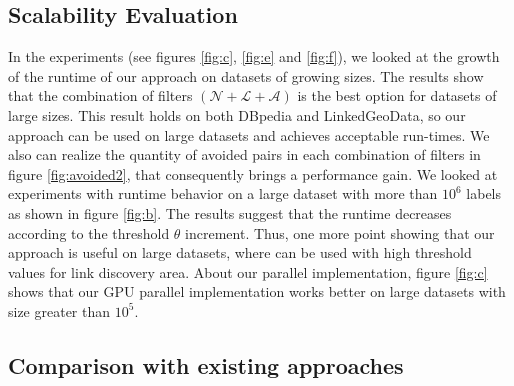 
\subsection{Scalability Evaluation}

In the experiments (see figures \ref{fig:c}, \ref{fig:e} and \ref{fig:f}), we looked at the growth of the runtime of our approach on datasets of growing sizes.
The results show that the combination of filters $(\mathcal{N}+\mathcal{L}+\mathcal{A})$ is the best option for datasets of large sizes.
This result holds on both DBpedia and LinkedGeoData, so our approach can be used on large datasets and achieves acceptable run-times. 
We also can realize the quantity of avoided pairs in each combination of filters in figure \ref{fig:avoided2}, that consequently brings a performance gain.
We looked at experiments with runtime behavior on a large dataset with more than $10^6$ labels as shown in figure \ref{fig:b}. The results suggest that the runtime decreases according to the threshold $\theta$ increment. Thus, one more point showing that our approach is useful on large datasets, where can be used with high threshold values for link discovery area.
About our parallel implementation, figure \ref{fig:c} shows that our GPU parallel implementation works better on large datasets with size greater than $10^5$. 

\subsection{Comparison with existing approaches} \label{comparisons}

